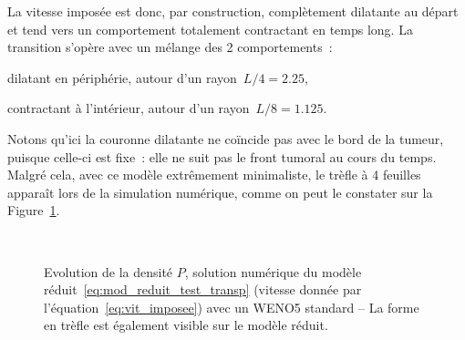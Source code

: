 \documentclass[main.tex]{subfiles}
\begin{document}
La vitesse imposée est donc, par construction, complètement dilatante au départ et tend vers un comportement totalement contractant en temps long. La transition s'opère avec un mélange des 2 comportements~:
\begin{myitemize}
\item dilatant en périphérie, autour d'un rayon~$L/4=2.25$,
\item contractant à l'intérieur, autour d'un rayon~$L/8=1.125$.
\end{myitemize}
Notons qu'ici la couronne dilatante ne coïncide pas avec le bord de la tumeur, puisque celle-ci est fixe~:  elle ne suit pas le front tumoral au cours du temps. 
Malgré cela, avec ce modèle extrêmement minimaliste, le trèfle à 4 feuilles apparaît lors de la simulation numérique, comme on peut le constater sur la Figure~\ref{fig:evo_test_transp}.
\begin{figure}
\centering
\\
\caption{Evolution de la densité $P$, solution numérique du modèle réduit~\eqref{eq:mod_reduit_test_transp} (vitesse donnée par l'équation~\eqref{eq:vit_imposee}) avec un WENO5 standard -- La forme en trèfle est également visible sur le modèle réduit.\label{fig:evo_test_transp}}
\end{figure}
\end{document}
